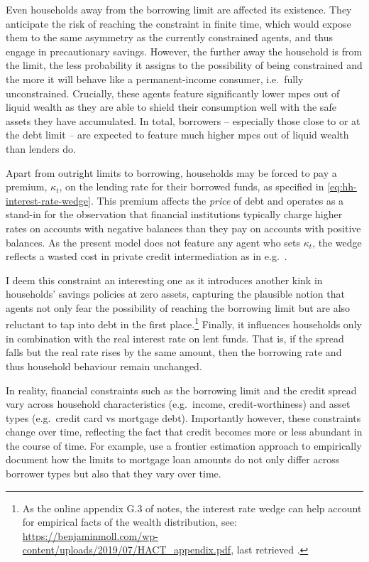 \documentclass[a4paper,12pt]{article} %
\numberwithin{equation}{section} %
\numberwithin{figure}{section}
\numberwithin{table}{section}
\begin{document}
Even households away from the borrowing limit are affected its existence. They anticipate the risk of reaching the constraint in finite time, which would expose them to the same asymmetry as the currently constrained agents, and thus engage in precautionary savings. However, the further away the household is from the limit, the less probability it assigns to the possibility of being constrained and the more it will behave like a permanent-income consumer, i.e.~fully unconstrained. Crucially, these agents feature significantly lower \Gls{mpc}s out of liquid wealth as they are able to shield their consumption well with the safe assets they have accumulated. In total, borrowers -- especially those close to or at the debt limit -- are expected to feature much higher \Gls{mpc}s out of liquid wealth than lenders do.

Apart from outright limits to borrowing, households may be forced to pay a premium, $\kappa_t$, on the lending rate for their borrowed funds, as specified in \eqref{eq:hh-interest-rate-wedge}. This premium affects the \textit{price} of debt and operates as a stand-in for the observation that financial institutions typically charge higher rates on accounts with negative balances than they pay on accounts with positive balances. As the present model does not feature any agent who sets $\kappa_t$, the wedge reflects a wasted cost in private credit intermediation as in e.g.~\textcite{bayer2023}.

I deem this constraint an interesting one as it introduces another kink in households' savings policies at zero assets, capturing the plausible notion that agents not only fear the possibility of reaching the borrowing limit but are also reluctant to tap into debt in the first place.\footnote{As the online appendix G.3 of \textcite{achdou2022} notes, the interest rate wedge can help account for empirical facts of the wealth distribution, see: \url{https://benjaminmoll.com/wp-content/uploads/2019/07/HACT_appendix.pdf}, last retrieved .} Finally, it influences households only in combination with the real interest rate on lent funds. That is, if the spread falls but the real rate rises by the same amount, then the borrowing rate and thus household behaviour remain unchanged.

In reality, financial constraints such as the borrowing limit and the credit spread vary across household characteristics (e.g.~income, credit-worthiness) and asset types (e.g.~credit card vs mortgage debt). Importantly however, these constraints change over time, reflecting the fact that credit becomes more or less abundant in the course of time. For example, \textcite{anenberg2018} use a frontier estimation approach to empirically document how the limits to mortgage loan amounts do not only differ across borrower types but also that they vary over time.
\end{document}
